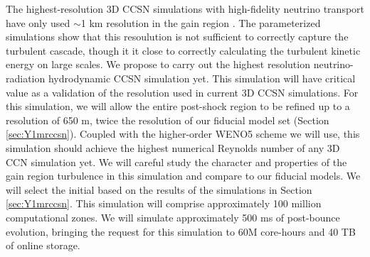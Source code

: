 The highest-resolution 3D CCSN simulations with high-fidelity neutrino transport have only used $\sim$1 km resolution in the gain region \citep{Roberts:2016, OConnor:2017}.
The parameterized simulations \citet{Radice:2016} show that this resoulution is not sufficient to correctly capture the turbulent cascade, though it it close to correctly calculating the turbulent kinetic energy on large scales.
We propose to carry out the highest resolution neutrino-radiation hydrodynamic CCSN simulation yet.
This simulation will have critical value as a validation of the resolution used in current 3D CCSN simulations.
For this simulation, we will allow the entire post-shock region to be refined up to a resolution of 650 m, twice the resolution of our fiducial model set (Section \ref{sec:Y1mrccsn}).
Coupled with the higher-order WENO5 scheme we will use, this simulation should achieve the highest numerical Reynolds number of any 3D CCN simulation yet.
We will careful study the character and properties of the gain region turbulence in this simulation and compare to our fiducial models.
We will select the initial based on the results of the simulations in Section \ref{sec:Y1mrccsn}.
This simulation will comprise approximately 100 million computational zones.
We will simulate approximately 500 ms of post-bounce evolution, bringing the request for this simulation to 60M core-hours and 40 TB of online storage.

